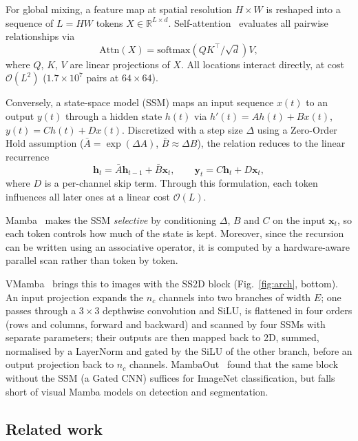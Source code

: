 \documentclass[conference]{IEEEtran}
\begin{document}
For global mixing, a feature map at spatial resolution $H \times W$ is reshaped into a sequence of $L = HW$ tokens $X \in \mathbb{R}^{L \times d}$. Self-attention~\cite{vaswani2017} evaluates all pairwise relationships via
\begin{equation}
  \mathrm{Attn}(X) = \mathrm{softmax}\left(QK^{\top}/\sqrt{d}\right)V,
  \label{eq:attn}
\end{equation}
where $Q$, $K$, $V$ are linear projections of $X$. All locations interact
directly, at cost $\mathcal{O}(L^2)$ ($1.7 \times 10^7$ pairs at $64 \times 64$).

Conversely, a state-space model (SSM) maps an input sequence $x(t)$ to an
output $y(t)$ through a hidden state $h(t)$ via $h'(t) = A h(t) + B x(t)$,
$y(t) = C h(t) + D x(t)$. Discretized with a step size $\Delta$ using a Zero-Order Hold assumption ($\bar{A} = \exp(\Delta A)$, $\bar{B} \approx \Delta B$), the relation reduces to the linear recurrence~\cite{gu2022s4}
\begin{equation}
  \mathbf{h}_t = \bar{A}\mathbf{h}_{t-1} + \bar{B}\mathbf{x}_t, \qquad \mathbf{y}_t = C\mathbf{h}_t + D\mathbf{x}_t,
  \label{eq:ssm}
\end{equation}
where $D$ is a per-channel skip term. Through this formulation, each token influences all later ones at
a linear cost $\mathcal{O}(L)$. 

Mamba~\cite{gu2024mamba} makes the SSM
\emph{selective} by conditioning $\Delta$, $B$ and $C$ on the input $\mathbf{x}_t$, so
each token controls how much of the state is kept. Moreover, since the recursion can be written using an associative operator, it is computed by a hardware-aware parallel scan rather than
token by token.

VMamba~\cite{liu2024vmamba} brings this to images with the SS2D block
(Fig.~\ref{fig:arch}, bottom). An input projection expands the $n_c$ channels
into two branches of width $E$; one passes through a $3\times3$ depthwise
convolution and SiLU, is flattened in four orders (rows and columns, forward
and backward) and scanned by four SSMs with separate parameters; their outputs
are then mapped back to 2D, summed, normalised by a LayerNorm and gated by the
SiLU of the other branch, before an output projection back to $n_c$ channels.
MambaOut~\cite{yu2025mambaout} found
that the same block without the SSM (a Gated CNN) suffices for ImageNet
classification, but falls short of visual Mamba models on detection and
segmentation.

\subsection{Related work}
\end{document}
